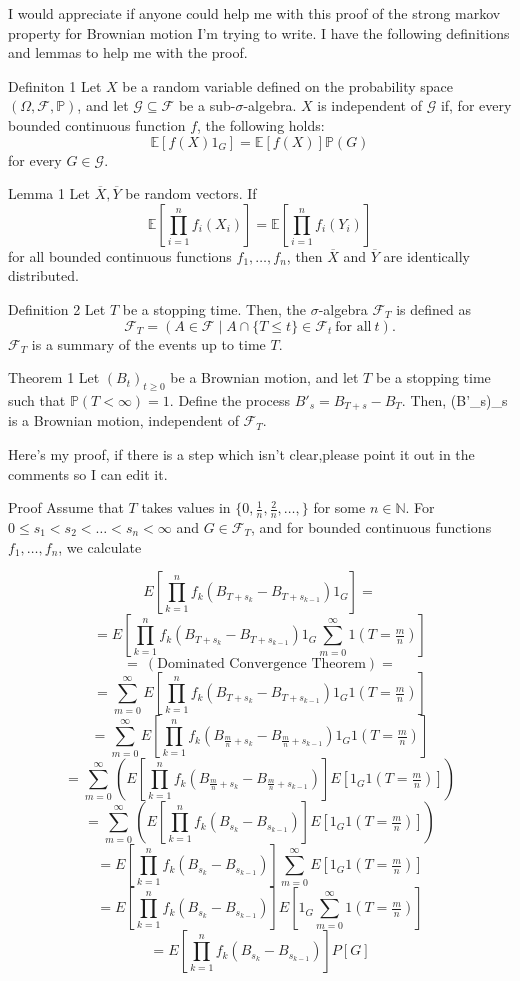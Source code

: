 \documentclass[12pt]{article}
\begin{document}
I would appreciate if anyone could help me with this proof of the strong markov property for Brownian motion I'm trying to write. I have the following definitions and lemmas to help me with the proof.

Definiton 1 
Let $X$ be a random variable defined on the probability space $(\Omega, \mathcal{F}, \mathbb{P})$, and let $\mathcal{G} \subseteq \mathcal{F}$ be a sub-$\sigma$-algebra. $X$ is independent of $\mathcal{G}$ if, for every bounded continuous function $f$, the following holds:
    $$
        \mathbb{E}\left[f(X)1_G\right] = \mathbb{E}\left[f(X)\right]\mathbb{P}(G)
    $$
    for every $G \in \mathcal{G}$.

Lemma 1  
    Let $\overline{X}, \overline{Y}$ be random vectors. If
    $$
        \mathbb{E}\left[\prod_{i=1}^n f_i(X_i)\right] = \mathbb{E}\left[\prod_{i=1}^n f_i(Y_i)\right]
    $$
    for all bounded continuous functions $f_1, \ldots, f_n$, then $\overline{X}$ and $\overline{Y}$ are identically distributed.


Definition 2  
    Let $T$ be a stopping time. Then, the $\sigma$-algebra $\mathcal{F}_T$ is defined as
    $$
    \mathcal{F}_T = \left(A \in \mathcal{F} \mid A \cap \{T \leq t\} \in \mathcal{F}_t \ \text{for all} \ t\right).
    $$
    $\mathcal{F}_T$ is a summary of the events up to time $T$.


Theorem 1  
Let $(B_t)_{t \geq 0}$ be a Brownian motion, and let $T$ be a stopping time such that $\mathbb{P} (T < \infty ) = 1$. Define the process $B'_s = B_{T + s} - B_T.$
Then, (B'_s)_{s } is a Brownian motion, independent of $\mathcal{F}_T$.

Here's my proof, if there is a step which isn't clear,please point it out in the comments so I can edit it.

Proof   
Assume that $T$ takes values in $ \{ 0, \tfrac{1}{n}, \tfrac{2}{n}, \ldots, \} $ for some $n\in\mathbb{N}$. For $0 \leq s_1 < s_2 < \ldots < s_n < \infty$ and $G \in \mathcal{F}_T$, and for bounded continuous functions $f_1, \ldots, f_n$, we calculate


$$ E\left[\prod_{k=1}^nf_k\left(B_{T+s_k} - B_{T + s_{k-1}}\right)1_G\right] = $$
 $$ = E\left[\prod_{k=1}^nf_k\left(B_{T+s_k} - B_{T + s_{k-1}}\right)1_G\sum_{m=0}^\infty1(T=\tfrac{m}{n})\right] $$
  $$= \ (\text{Dominated Convergence Theorem}) = $$
  $$=\sum_{m=0}^\infty E\left[\prod_{k=1}^nf_k\left(B_{T+s_k} - B_{T + s_{k-1}}\right)1_G1(T = \tfrac{m}{n})\right] $$
 $$ =\sum_{m=0}^\infty E\left[\prod_{k=1}^nf_k\left(B_{\tfrac{m}{n}+s_k} - B_{\tfrac{m}{n} + s_{k-1}}\right)1_G1(T = \tfrac{m}{n})\right] $$
  $$= \sum_{m=0}^\infty\left(E\left[\prod_{k=1}^nf_k\left(B_{\tfrac{m}{n}+s_k} - B_{\tfrac{m}{n} + s_{k-1}}\right)\right]E\left[1_G1(T = \tfrac{m}{n})\right]\right) $$
 $$ = \sum_{m=0}^\infty\left(E\left[\prod_{k=1}^nf_k\left(B_{s_k} - B_{s_{k-1}}\right)\right]E\left[1_G1(T = \tfrac{m}{n})\right]\right) $$
 $$ = E\left[\prod_{k=1}^nf_k\left(B_{s_k} - B_{s_{k-1}}\right)\right]\sum_{m=0}^\infty E\left[1_G1(T=\tfrac{m}{n})\right] $$
 $$ = E\left[\prod_{k=1}^nf_k\left(B_{s_k} - B_{s_{k-1}}\right)\right]E\left[1_G\sum_{m=0}^\infty1(T=\tfrac{m}{n})\right] $$
 $$ = E\left[\prod_{k=1}^nf_k\left(B_{s_k} - B_{s_{k-1}}\right)\right]P\left[G\right] $$
\end{document}
